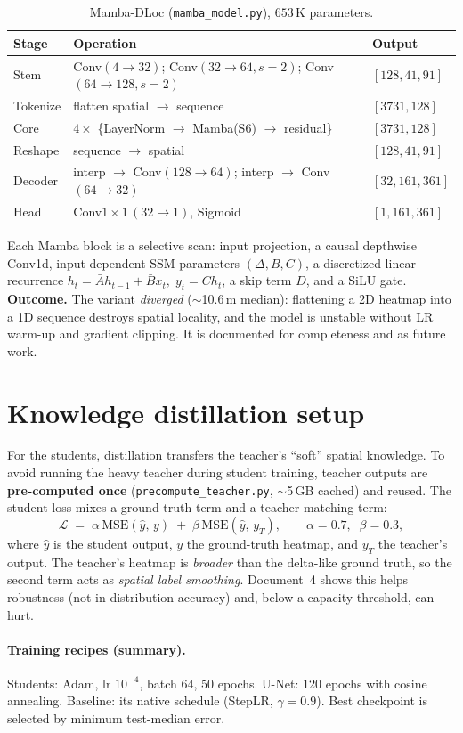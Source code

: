 \documentclass[11pt,a4paper]{article}
\newcommand{\code}[1]{\texttt{\small #1}}
\begin{document}
\begin{table}[h]
\centering
\caption{Mamba-DLoc (\code{mamba\_model.py}), $653$\,K parameters.}
\begin{tabular}{@{}lll@{}}
\toprule
Stage & Operation & Output \\
\midrule
Stem    & Conv$(4\!\to\!32)$; Conv$(32\!\to\!64,s{=}2)$; Conv$(64\!\to\!128,s{=}2)$ & $[128,41,91]$ \\
Tokenize& flatten spatial $\to$ sequence                                            & $[3731,128]$ \\
Core    & $4\times$ \{LayerNorm $\to$ Mamba(S6) $\to$ residual\}                     & $[3731,128]$ \\
Reshape & sequence $\to$ spatial                                                     & $[128,41,91]$ \\
Decoder & interp $\to$ Conv$(128\!\to\!64)$; interp $\to$ Conv$(64\!\to\!32)$        & $[32,161,361]$ \\
Head    & Conv$1\times1\,(32\!\to\!1)$, Sigmoid                                      & $[1,161,361]$ \\
\bottomrule
\end{tabular}
\end{table}

Each Mamba block is a selective scan: input projection, a causal depthwise Conv1d, input-dependent
SSM parameters $(\Delta, B, C)$, a discretized linear recurrence
$h_t = \bar{A}h_{t-1} + \bar{B}x_t,\; y_t = C h_t$, a skip term $D$, and a SiLU gate.
\textbf{Outcome.} The variant \emph{diverged} ($\sim$10.6\,m median): flattening a 2D heatmap into
a 1D sequence destroys spatial locality, and the model is unstable without LR warm-up and gradient
clipping. It is documented for completeness and as future work.

\section{Knowledge distillation setup}

For the students, distillation transfers the teacher's ``soft'' spatial knowledge. To avoid
running the heavy teacher during student training, teacher outputs are \textbf{pre-computed once}
(\code{precompute\_teacher.py}, $\sim$5\,GB cached) and reused. The student loss mixes a
ground-truth term and a teacher-matching term:
\begin{equation}
\mathcal{L} \;=\; \alpha\,\text{MSE}(\hat{y},\,y)\;+\;\beta\,\text{MSE}(\hat{y},\,y_T),
\qquad \alpha = 0.7,\;\; \beta = 0.3,
\end{equation}
where $\hat y$ is the student output, $y$ the ground-truth heatmap, and $y_T$ the teacher's
output. The teacher's heatmap is \emph{broader} than the delta-like ground truth, so the second
term acts as \emph{spatial label smoothing}. Document~4 shows this helps robustness (not
in-distribution accuracy) and, below a capacity threshold, can hurt.

\paragraph{Training recipes (summary).} Students: Adam, lr $10^{-4}$, batch 64, 50 epochs.
U-Net: 120 epochs with cosine annealing. Baseline: its native schedule (StepLR, $\gamma=0.9$).
Best checkpoint is selected by minimum test-median error.
\end{document}
